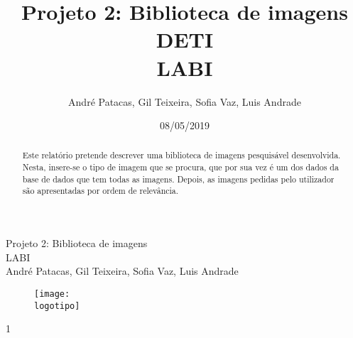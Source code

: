 \documentclass{report}
\begin{document}
%
\def\titulo{Projeto 2: Biblioteca de imagens}
\def\data{08/05/2019}
\def\autores{André Patacas, Gil Teixeira, Sofia Vaz, Luis Andrade}
\def\autorescontactos{(93357) andrepatacas@ua.pt, (88194) gilteixeira@ua.pt, (92968) sofiateixeiravaz@ua.pt, (93159) luisnunoferreirap.a@ua.pt}
\def\versao{1}
\def\departamento{DETI}
\def\empresa{LABI}
\def\logotipo{ua.pdf}

%
%
\begin{titlepage}

\begin{center}
\centering
%
\vspace*{50mm}
%
{\Huge \titulo}\\ 
%
\vspace{10mm}
%
{\Large \empresa}\\
%
\vspace{10mm}
%
{\large \autores}\\ 
%
\vspace{30mm}
%
\begin{figure}[h]
\centering
\texttt{[image: \\logotipo]}
\end{figure}
%
\vspace{30mm}
\end{center}
%
\begin{flushright}
\versao
\end{flushright}
\end{titlepage}

\title{%
{\Huge\textbf{\titulo}}\\
{\Large \departamento\\ \empresa}
}
%
\author{%
    \autores 
}
%
\date{\data}
%
\maketitle



\begin{abstract}
Este relatório pretende descrever uma biblioteca de imagens pesquisável desenvolvida. 
Nesta, insere-se o tipo de imagem que se procura, que por sua vez é um dos dados da base de dados que tem todas as imagens. Depois, as imagens pedidas pelo utilizador são apresentadas por ordem de relevância.
\end{abstract}


\tableofcontents
\end{document}
